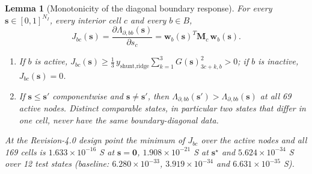 \documentclass[11pt,a4paper]{article}
\newtheorem{lemma}[theorem]{Lemma}
\theoremstyle{definition}
\theoremstyle{remark}
\begin{document}
\begin{lemma}[Monotonicity of the diagonal boundary response]\label{lem:monotone}
For every $\mathbf{s}\in[0,1]^{N_I}$, every interior cell $c$ and every $b\in B$,
\begin{equation}\label{eq:mono}
J_{bc}(\mathbf{s}) = \frac{\partial\Lambda_{\partial,bb}(\mathbf{s})}{\partial s_c} = \mathbf{w}_b(\mathbf{s})^T\mathbf{M}_c\,\mathbf{w}_b(\mathbf{s}).
\end{equation}
\begin{enumerate}
\item If $b$ is active, $J_{bc}(\mathbf{s}) \ge \tfrac13\,y_{\text{shunt,ridge}}\sum_{k=1}^3 G(\mathbf{s})_{3c+k,b}^2 > 0$; if $b$ is inactive, $J_{bc}(\mathbf{s}) = 0$.
\item If $\mathbf{s}\le\mathbf{s}'$ componentwise and $\mathbf{s}\neq\mathbf{s}'$, then $\Lambda_{\partial,bb}(\mathbf{s}') > \Lambda_{\partial,bb}(\mathbf{s})$ at all 69 active nodes. Distinct comparable states, in particular two states that differ in one cell, never have the same boundary-diagonal data.
\end{enumerate}
At the Revision-4.0 design point the minimum of $J_{bc}$ over the active nodes and all 169 cells is $1.633\times10^{-16}$ S at $\mathbf{s} = \mathbf{0}$, $1.908\times10^{-21}$ S at $\mathbf{s}^\star$ and $5.624\times10^{-34}$ S over 12 test states (baseline: $6.280\times10^{-33}$, $3.919\times10^{-34}$ and $6.631\times10^{-35}$ S).
\end{lemma}
\end{document}
